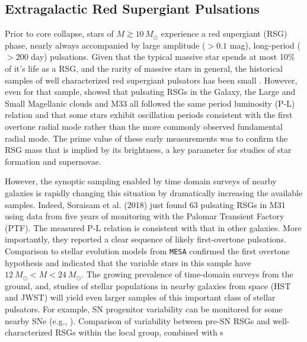 {\color{green}
\subsection{Extragalactic Red Supergiant Pulsations}
}


Prior to core collapse, stars of $M \! \gtrsim \! 10 \, M_\odot$ experience a red
supergiant (RSG) phase, nearly always accompanied by large amplitude
($>0.1$ mag), long-period ($>200 $ day) pulsations.  Given that the
typical massive star spends at most 10$\%$ of it's life as a RSG, and
the rarity of massive stars in general, the historical samples of well
characterized red supergiant pulsators has been small \citep[see][for a nice compilation]{Yang_2012}. However, even for that sample, \citet{Yang_2012} showed that pulsating RSGs in the Galaxy, the Large and Small Magellanic clouds and M33 all followed the
same period luminosity (P-L) relation and that some stars exhibit
oscillation periods consistent with the first overtone radial mode
rather than the more commonly observed fundamental radial mode. The
prime value of these early measurements was to confirm the RSG mass
that is implied by its brightness, a key parameter for studies of star
formation and supernovae. 

However, the synoptic sampling enabled by time domain surveys of
nearby galaxies is rapidly changing this situation by dramatically
increasing the available samples. Indeed, Soraisam et al. (2018) just
found 63 pulsating RSGs in M31 using data from five years of
monitoring with the Palomar Transient Factory (PTF). The measured P-L
relation is consistent with that in other galaxies. More importantly,
they reported a clear sequence of likely first-overtone
pulsations. Comparison to stellar evolution models from \texttt{MESA}
confirmed the first overtone hypothesis and indicated that the
variable stars in this sample have $12~M_{\odot} \! < \! M \! < \! 24~M_{\odot}$. The growing prevalence of time-domain surveys from the ground, and, studies 
of stellar populations in nearby galaxies from space (HST and JWST) 
will yield even larger samples of this important class of stellar pulsators. For example, SN progenitor variability can be monitored for some nearby SNe (e.g., \citealt{kochanek:17}). Comparison of variability between pre-SN RSGs and well-characterized RSGs within the local group, combined with s